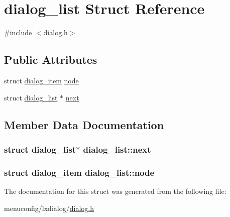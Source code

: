 \hypertarget{structdialog__list}{\section{dialog\-\_\-list Struct Reference}
\label{structdialog__list}
}


{\ttfamily \#include $<$dialog.\-h$>$}

\subsection*{Public Attributes}
\begin{DoxyCompactItemize}
\item 
struct \hyperlink{structdialog__item}{dialog\-\_\-item} \hyperlink{structdialog__list_aa40ec06e6f6480e2022f4ad6cce8243f}{node}
\item 
struct \hyperlink{structdialog__list}{dialog\-\_\-list} $\ast$ \hyperlink{structdialog__list_a871012485a0b37aa851161bb5d044961}{next}
\end{DoxyCompactItemize}


\subsection{Member Data Documentation}
\hypertarget{structdialog__list_a871012485a0b37aa851161bb5d044961}{
\subsubsection[{next}]{\setlength{\rightskip}{0pt plus 5cm}struct {\bf dialog\-\_\-list}$\ast$ dialog\-\_\-list\-::next}}\label{structdialog__list_a871012485a0b37aa851161bb5d044961}
\hypertarget{structdialog__list_aa40ec06e6f6480e2022f4ad6cce8243f}{
\subsubsection[{node}]{\setlength{\rightskip}{0pt plus 5cm}struct {\bf dialog\-\_\-item} dialog\-\_\-list\-::node}}\label{structdialog__list_aa40ec06e6f6480e2022f4ad6cce8243f}


The documentation for this struct was generated from the following file\-:\begin{DoxyCompactItemize}
\item 
menuconfig/lxdialog/\hyperlink{dialog_8h}{dialog.\-h}\end{DoxyCompactItemize}

